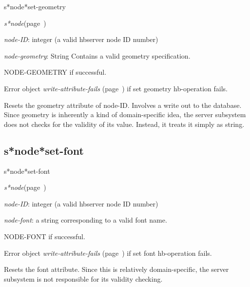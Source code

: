 \begin{description}
\item [Name:]  s*node*set-geometry

\item [Class:] {\sl s*node}\hfill(page~\pageref{s*node})

\item [Parameters:]
\item {\sl node-ID}:  
integer (a valid hbserver node ID number)

\item {\sl node-geometry}:  String
Contains a valid geometry specification.
 

\item [Return-value:]
NODE-GEOMETRY if successful.

Error object {\sl write-attribute-fails} (page~\pageref{write-attribute-fails}) if set geometry
hb-operation fails.

\item [Description:]
Resets the geometry attribute of node-ID.  
Involves a write out to the database.
Since geometry is inherently a kind of 
domain-specific idea, the server subsystem
does not checks for the validity of its
value. Instead, it treats it simply as
string. 

\item [Public:]



\end{description}
\horizontalline

\subsection{s*node*set-font}
\label{s*node*set-font}

\begin{description}
\item [Name:]  s*node*set-font

\item [Class:] {\sl s*node}\hfill(page~\pageref{s*node})

\item [Parameters:]
\item {\sl node-ID}:  
integer (a valid hbserver node ID number)

\item {\sl node-font}:  a string corresponding to a valid font name.


\item [Return-value:]
NODE-FONT if successful.

Error object {\sl write-attribute-fails} (page~\pageref{write-attribute-fails}) if set font
hb-operation fails.

\item [Description:]
Resets the font attribute.  Since this
is relatively domain-specific, the server
subsystem is not responsible for its
validity checking.

\item [Public:]



\end{description}
\horizontalline

